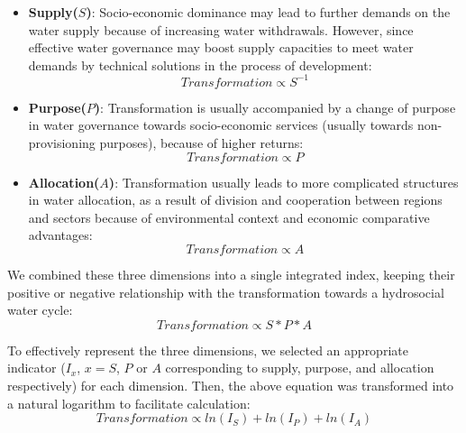 	\begin{itemize}
		\item \textbf{Supply($S$)}: Socio-economic dominance may lead to further demands on the water supply because of increasing water withdrawals. However, since effective water governance may boost supply capacities to meet water demands by technical solutions in the process of development:
		\begin{equation}
			Transformation \propto S^{-1}
		\end{equation}


		\item \textbf{Purpose($P$)}: Transformation is usually accompanied by a change of purpose in water governance towards socio-economic services (usually towards non-provisioning purposes), because of higher returns:
		\begin{equation}
			Transformation \propto P
		\end{equation}

		\item \textbf{Allocation($A$)}: Transformation usually leads to more complicated structures in water allocation, as a result of division and cooperation between regions and sectors because of environmental context and economic comparative advantages:
		\begin{equation}
			Transformation \propto A
		\end{equation}

	\end{itemize}

	We combined these three dimensions into a single integrated index, keeping their positive or negative relationship with the transformation towards a hydrosocial water cycle:
	\begin{equation}
		Transformation \propto S*P*A
	\end{equation}

	To effectively represent the three dimensions, we selected an appropriate indicator ($I_x$, $x=S$, $P$ or $A$ corresponding to supply, purpose, and allocation respectively) for each dimension. Then, the above equation was transformed into a natural logarithm to facilitate calculation:
	\begin{equation}
		Transformation \propto ln(I_S) + ln(I_P) + ln(I_A)
	\end{equation}

